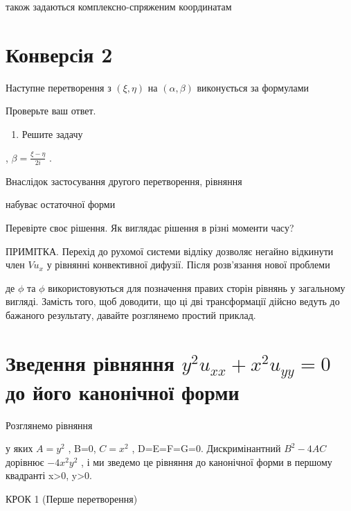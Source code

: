 \documentclass[
  ukrainian,
]{article}
\providecommand{\tightlist}{%
  \setlength{\itemsep}{0pt}\setlength{\parskip}{0pt}}
\begin{document}
також задаються комплексно-спряженим координатам

\section{Конверсія
2}\label{ux43aux43eux43dux432ux435ux440ux441ux456ux44f-2}

Наступне перетворення з \((\xi,\eta)\) на \((\alpha,\beta)\) виконується
за формулами

Проверьте ваш ответ.

\begin{enumerate}
\def\labelenumi{\arabic{enumi}.}
\setcounter{enumi}{3}
\tightlist
\item
  Решите задачу
\end{enumerate}

, \(\beta = \frac{\xi - \eta}{2i}\) .

Внаслідок застосування другого перетворення, рівняння

набуває остаточної форми

Перевірте своє рішення. Як виглядає рішення в різні моменти часу?

ПРИМІТКА. Перехід до рухомої системи відліку дозволяє негайно відкинути
член \(Vu_x\) у рівнянні конвективної дифузії. Після розв'язання нової
проблеми

де \(\phi\) та \(\phi\) використовуються для позначення правих сторін
рівнянь у загальному вигляді. Замість того, щоб доводити, що ці дві
трансформації дійсно ведуть до бажаного результату, давайте розглянемо
простий приклад.

\section{\texorpdfstring{Зведення рівняння \(y^2u_{xx} + x^2u_{yy} = 0\)
до його канонічної
форми}{Зведення рівняння y\^{}2u\_\{xx\} + x\^{}2u\_\{yy\} = 0 до його канонічної форми}}\label{ux437ux432ux435ux434ux435ux43dux43dux44f-ux440ux456ux432ux43dux44fux43dux43dux44f-y2u_xx-x2u_yy-0-ux434ux43e-ux439ux43eux433ux43e-ux43aux430ux43dux43eux43dux456ux447ux43dux43eux457-ux444ux43eux440ux43cux438}

Розглянемо рівняння

у яких \(A=y^2\) , B=0, \(C=x^2\) , D=E=F=G=0. Дискримінантний
\(B^2-4AC\) дорівнює \(-4x^2y^2\) , і ми зведемо це рівняння до
канонічної форми в першому квадранті x\textgreater0, y\textgreater0.

КРОК 1 (Перше перетворення)
\end{document}

